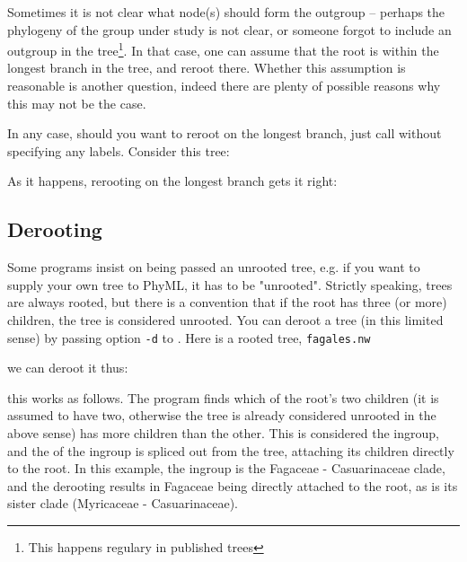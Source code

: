 \noindent{}Sometimes it is not clear what node(s) should form the outgroup --
perhaps the phylogeny of the group under study is not clear, or someone forgot
to include an outgroup in the tree\footnote{This happens regulary in published
trees}. In that case, one can assume that the root is within the longest branch
in the tree, and reroot there. Whether this assumption is reasonable is another
question, indeed there are plenty of possible reasons why this may not be the
case.

In any case, should you want to reroot on the longest branch, just call
\reroot{} without specifying any labels. Consider this tree:
\startalignment[center]
\stopalignment

As it happens, rerooting on the longest branch gets it right:

\startalignment[center]
\stopalignment






\subsection{Derooting}

Some programs insist on being passed an unrooted tree, e.g. if you want to
supply your own tree to PhyML, it has to be "unrooted". Strictly speaking,
\nw{} trees are always rooted, but there is a convention that if the root has
three (or more) children, the tree is considered unrooted. You can deroot a
tree (in this limited sense) by passing option \texttt{-d} to \reroot{}. Here
is a rooted tree, \texttt{fagales.nw}

\startalignment[center]
\stopalignment

\noindent{}we can deroot it thus:

\startalignment[center]
\stopalignment

\noindent{}this works as follows. The program finds which of the root's two
children (it is assumed to have two, otherwise the tree is already considered
unrooted in the above sense) has more children than the other. This is
considered the ingroup, and the \lca{} of the ingroup is spliced out from the
tree, attaching its children directly to the root. In this example, the ingroup
is the Fagaceae - Casuarinaceae clade, and the derooting results in Fagaceae
being directly attached to the root, as is its sister clade (Myricaceae -
Casuarinaceae).

